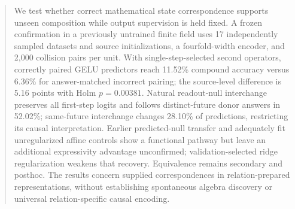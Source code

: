 \begin{abstract}
We test whether correct mathematical state correspondence supports unseen composition while output supervision is held fixed. A frozen confirmation in a previously untrained finite field uses 17 independently sampled datasets and source initializations, a fourfold-width encoder, and 2,000 collision pairs per unit. With single-step-selected second operators, correctly paired GELU predictors reach 11.52\% compound accuracy versus 6.36\% for answer-matched incorrect pairing; the source-level difference is 5.16 points with Holm $p=0.00381$. Natural readout-null interchange preserves all first-step logits and follows distinct-future donor answers in 52.02\%; same-future interchange changes 28.10\% of predictions, restricting its causal interpretation. Earlier predicted-null transfer and adequately fit unregularized affine controls show a functional pathway but leave an additional expressivity advantage unconfirmed; validation-selected ridge regularization weakens that recovery. Equivalence remains secondary and posthoc. The results concern supplied correspondences in relation-prepared representations, without establishing spontaneous algebra discovery or universal relation-specific causal encoding.
\end{abstract}
